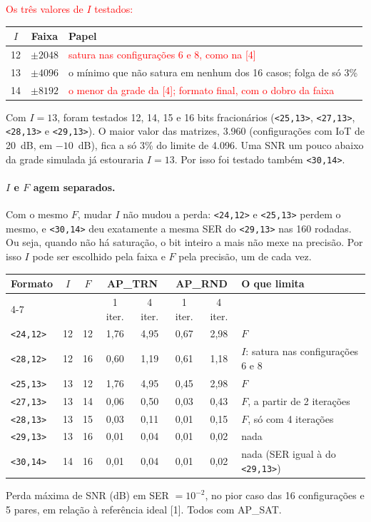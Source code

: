 \documentclass[11pt]{article}
\newcommand{\novo}[1]{\textcolor{red}{#1}}
\begin{document}
\novo{Os três valores de $I$ testados:}
\begin{center}
\small
\renewcommand{\arraystretch}{1.15}
\begin{tabular}{|c|c|l|}
\hline
$I$ & Faixa & Papel \\
\hline
12 & $\pm 2048$ & \novo{satura nas configurações 6 e 8, como na [4]} \\
13 & $\pm 4096$ & o mínimo que não satura em nenhum dos 16 casos; folga de só 3\% \\
14 & $\pm 8192$ & \novo{o menor da grade da [4]; formato final, com o dobro da faixa} \\
\hline
\end{tabular}
\end{center}
Com $I = 13$, foram testados 12, 14, 15 e 16 bits fracionários (\texttt{<25,13>},
\texttt{<27,13>}, \texttt{<28,13>} e \texttt{<29,13>}). O maior valor das matrizes, 3.960
(configurações com IoT de 20~dB, em $-10$~dB), fica a só 3\% do limite de 4.096. Uma SNR um pouco
abaixo da grade simulada já estouraria $I = 13$. Por isso foi testado também \texttt{<30,14>}.

\paragraph{$I$ e $F$ agem separados.} Com o mesmo $F$, mudar $I$ não mudou a perda:
\texttt{<24,12>} e \texttt{<25,13>} perdem o mesmo, e \texttt{<30,14>} deu exatamente a mesma SER
do \texttt{<29,13>} nas 160 rodadas. Ou seja, quando não há saturação, o bit inteiro a mais não
mexe na precisão. Por isso $I$ pode ser escolhido pela faixa e $F$ pela precisão, um de cada vez.

\begin{center}
\small
\renewcommand{\arraystretch}{1.15}
\begin{tabular}{|l|c|c|c|c|c|c|l|}
\hline
Formato & $I$ & $F$ & \multicolumn{2}{c|}{AP\_TRN} & \multicolumn{2}{c|}{AP\_RND} & O que limita \\
\cline{4-7}
 & & & 1 iter. & 4 iter. & 1 iter. & 4 iter. & \\
\hline
\texttt{<24,12>} & 12 & 12 & 1,76 & 4,95 & 0,67 & 2,98 & $F$ \\
\texttt{<28,12>} & 12 & 16 & 0,60 & 1,19 & 0,61 & 1,18 & $I$: satura nas configurações 6 e 8 \\
\texttt{<25,13>} & 13 & 12 & 1,76 & 4,95 & 0,45 & 2,98 & $F$ \\
\texttt{<27,13>} & 13 & 14 & 0,06 & 0,50 & 0,03 & 0,43 & $F$, a partir de 2 iterações \\
\texttt{<28,13>} & 13 & 15 & 0,03 & 0,11 & 0,01 & 0,15 & $F$, só com 4 iterações \\
\texttt{<29,13>} & 13 & 16 & 0,01 & 0,04 & 0,01 & 0,02 & nada \\
\texttt{<30,14>} & 14 & 16 & 0,01 & 0,04 & 0,01 & 0,02 & nada (SER igual à do \texttt{<29,13>}) \\
\hline
\end{tabular}
\end{center}
Perda máxima de SNR (dB) em SER $= 10^{-2}$, no pior caso das 16 configurações e 5 pares, em
relação à referência ideal [1]. Todos com AP\_SAT.
\end{document}
